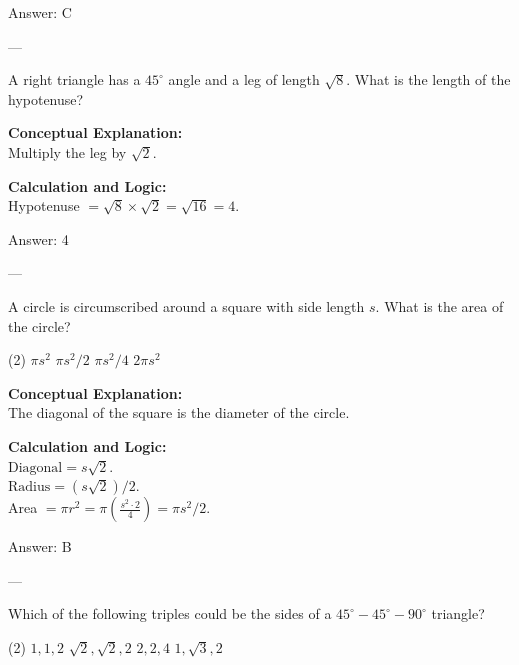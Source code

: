 \documentclass[11pt,paper=a4,answers]{exam}
\begin{document}
\begin{questions}
\begin{solution}
\vspace{15pt}
Answer: \colorbox{yellow!100}{C}
\end{solution}

---

\question
A right triangle has a $45^\circ$ angle and a leg of length $\sqrt{8}$. What is the length of the hypotenuse?

\begin{solution}
\textbf{Conceptual Explanation:} \\
Multiply the leg by $\sqrt{2}$.

\vspace{10pt}
\textbf{Calculation and Logic:} \\
Hypotenuse $= \sqrt{8} \times \sqrt{2} = \sqrt{16} = 4$.

\vspace{15pt}
Answer: \colorbox{yellow!100}{4}
\end{solution}

---

\question
A circle is circumscribed around a square with side length $s$. What is the area of the circle?
\begin{tasks}(2)
    \task $\pi s^2$
    \task $\pi s^2 / 2$
    \task $\pi s^2 / 4$
    \task $2\pi s^2$
\end{tasks}

\begin{solution}
\textbf{Conceptual Explanation:} \\
The diagonal of the square is the diameter of the circle.

\vspace{10pt}
\textbf{Calculation and Logic:} \\
$\text{Diagonal} = s\sqrt{2}$. \\
$\text{Radius} = (s\sqrt{2})/2$. \\
Area $= \pi r^2 = \pi (\frac{s^2 \cdot 2}{4}) = \pi s^2 / 2$.

\vspace{15pt}
Answer: \colorbox{yellow!100}{B}
\end{solution}

---

\question
Which of the following triples could be the sides of a $45^\circ-45^\circ-90^\circ$ triangle?
\begin{tasks}(2)
    \task $1, 1, 2$
    \task $\sqrt{2}, \sqrt{2}, 2$
    \task $2, 2, 4$
    \task $1, \sqrt{3}, 2$
\end{tasks}


\end{questions}
\end{document}
